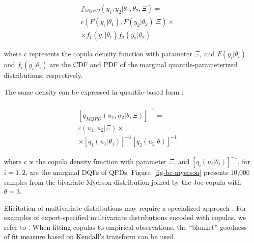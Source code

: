 \documentclass[
  fleqn,
  deca,
  blindrev
]{informs4}
\begin{document}
\[
\begin{gathered}
f_{MQPD}(y_1,y_2\vert \theta_1,\theta_2,\Xi)=\\
c(F(y_1\vert\theta_1),F(y_2\vert\theta_2)\vert\Xi)\times \\
\times f_1\left(y_1\vert\theta_1\right) f_2\left(y_2\vert\theta_2\right)
\end{gathered}
\]

where \(c\) represents the copula density function with parameter
\(\Xi\), and \(F(y_i\vert\theta_i)\) and \(f_i(y_i\vert\theta_i)\) are
the CDF and PDF of the marginal quantile-parameterized distributions,
respectively.

The same density can be expressed in quantile-based form
\citep{perepolkin2023TenetsQuantilebasedInference}:

\[
\begin{gathered}\\
[q_{MQPD}(u_1,u_2\vert\theta, \Xi)]^{-1}=\\
c\left(u_1,u_2\vert\Xi\right)\times \\
\times [q_1(u_1\vert\theta_1)]^{-1}[q_2(u_2\vert\theta)]^{-1}
\end{gathered}
\]

where \(c\) is the copula density function with parameter \(\Xi\), and
\([q_i(u_i\vert\theta_i)]^{-1}\), for \(i=1,2\), are the marginal DQFs
of QPDs. Figure~\ref{fig-bc-myerson} presents 10,000 samples from the
bivariate Myerson distribution joined by the Joe copula with
\(\theta=3\).

Elicitation of multivariate distributions may require a specialized
approach
\citep{elfadaly2017ElicitingDirichletGaussian, wilson2021RecentAdvancesElicitation}.
For examples of expert-specified multivariate distributions encoded with
copulas, we refer to
\citep{wilson2018SpecificationInformativePrior, holzhauer2022ElicitingJudgementsDependent, sharma2018RegularizationVariableSelection, aas2009PaircopulaConstructionsMultiple}.
When fitting copulas to empirical observations, the ``blanket'' goodness
of fit measure \citep{wang2000ModelSelectionSemiparametric} based on
Kendall's transform
\citep{genest2006GoodnessofFitProceduresCopula, genest2009GoodnessoffitTestsCopulas}
can be used.
\end{document}
